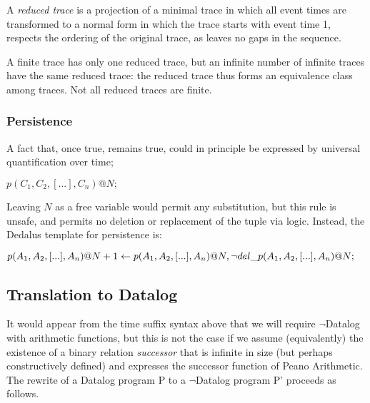 \documentclass{acm_proc_article-sp-sigmod09}
\newenvironment{Dedalus}{
\vspace{0.5em}\begin{minipage}{0.95\textwidth}%
\begin{alltt}\fontsize{9pt}{9pt}\selectfont}
{\end{alltt}\end{minipage}\vspace{0.5em}}
\begin{document}
\begin{definition}
A \emph{reduced trace} is a projection of a minimal trace in which all event times are transformed
to a normal form in which the trace starts with event time 1, respects the ordering of the original trace, as leaves no gaps in the sequence.
\end{definition}

A finite trace has only one reduced trace, but an infinite number of infinite traces have the same reduced trace: the reduced trace thus forms an 
equivalence class among traces.  Not all reduced traces are finite.

\subsubsection{Persistence}

A fact that, once true, remains true, could in principle be expressed by universal quantification over time;

$p(C_1,C_{2},[...],C_{n})@N;$

Leaving $N$ as a free variable would permit any substitution, but this rule is unsafe, and permits no deletion or replacement 
of the tuple via logic.  Instead, the Dedalus template for persistence is:

$p(A_{1}, A_{2}, [...], A_{n})@N+1 \leftarrow \\
  p(A_{1}, A_{2}, [...], A_{n})@N, \\
  \lnot del\_p(A_{1}, A_{2}, [...], A_{n})@N;
  $

\subsection{Translation to Datalog}

It would appear from the time suffix syntax above that we will require $\lnot$Datalog with arithmetic functions, but this is not the case if we assume
(equivalently) the existence of a binary relation \emph{successor} that is infinite in size (but perhaps constructively defined) and expresses the 
successor function of Peano Arithmetic.  The rewrite of a Datalog program P to a $\lnot$Datalog program P' proceeds as follows.
\end{document}
